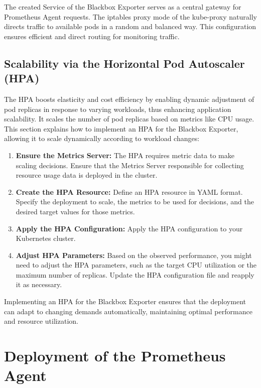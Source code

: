 The created Service of the Blackbox Exporter serves as a central gateway for Prometheus Agent requests. The iptables proxy mode of the kube-proxy naturally directs traffic to available pods in a random and balanced way. This configuration ensures efficient and direct routing for monitoring traffic. 

\subsection{Scalability via the Horizontal Pod Autoscaler (\ac{HPA})}

The \ac{HPA} boosts elasticity and cost efficiency by enabling dynamic adjustment of pod replicas in response to varying workloads, thus enhancing application scalability. It scales the number of pod replicas based on metrics like CPU usage. This section explains how to implement an \ac{HPA} for the Blackbox Exporter, allowing it to scale dynamically according to workload changes: 

\begin{enumerate}
    \item \textbf{Ensure the Metrics Server:}
    The \ac{HPA} requires metric data to make scaling decisions. Ensure that the Metrics Server responsible for collecting resource usage data is deployed in the cluster. 
    \item \textbf{Create the \ac{HPA} Resource:}
    Define an \ac{HPA} resource in YAML format. Specify the deployment to scale, the metrics to be used for decisions, and the desired target values for those metrics. 
    \item \textbf{Apply the \ac{HPA} Configuration:}
    Apply the \ac{HPA} configuration to your Kubernetes cluster. 
    \item \textbf{Adjust \ac{HPA} Parameters:}
    Based on the observed performance, you might need to adjust the \ac{HPA} parameters, such as the target \ac{CPU} utilization or the maximum number of replicas. Update the \ac{HPA} configuration file and reapply it as necessary.
\end{enumerate}

Implementing an \ac{HPA} for the Blackbox Exporter ensures that the deployment can adapt to changing demands automatically, maintaining optimal performance and resource utilization.

\section{Deployment of the Prometheus Agent}

